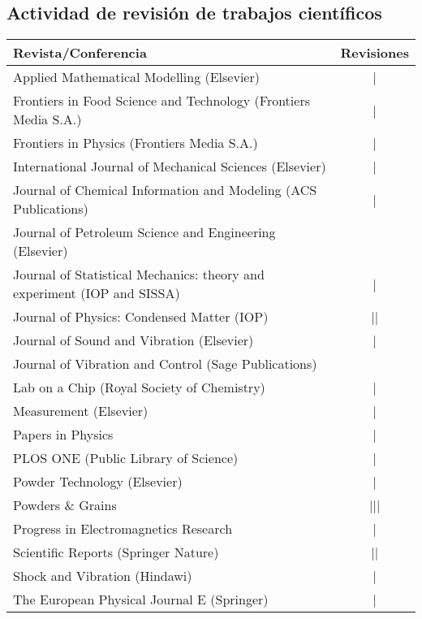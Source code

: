 \subsection{Actividad de revisión de trabajos científicos}
\begin{tabular}{l c}
    \toprule
    \textbf{Revista/Conferencia} & R\textbf{evisiones} \\
    \midrule
    Applied Mathematical Modelling (Elsevier) & | \\ 
    Frontiers in Food Science and Technology (Frontiers Media S.A.) & | \\
    Frontiers in Physics (Frontiers Media S.A.) & | \\
    International Journal of Mechanical Sciences (Elsevier) & | \\
    Journal of Chemical Information and Modeling (ACS Publications) & | \\
    Journal of Petroleum Science and Engineering (Elsevier) & \cancel{||||} \\
    Journal of Statistical Mechanics: theory and experiment (IOP and SISSA) & | \\
    Journal of Physics: Condensed Matter (IOP) & || \\
    Journal of Sound and Vibration (Elsevier) & \cancel{||||} | \\
    Journal of Vibration and Control (Sage Publications) & \cancel{||||} \\
    Lab on a Chip (Royal Society of Chemistry) & | \\
    Measurement (Elsevier) &  | \\
    Papers in Physics & | \\
    PLOS ONE (Public Library of Science) & | \\
    Powder Technology (Elsevier) & | \\
    Powders \& Grains & ||| \\
    Progress in Electromagnetics Research & | \\
    Scientific Reports (Springer Nature) & || \\
    Shock and Vibration (Hindawi) &  | \\
    The European Physical Journal E (Springer) & | \\
    \bottomrule
\end{tabular}

